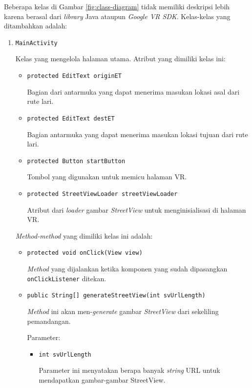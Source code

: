Beberapa kelas di Gambar \ref{fig:class-diagram} tidak memiliki deskripsi lebih karena berasal dari \textit{library} Java ataupun \textit{Google VR SDK}. Kelas-kelas yang ditambahkan adalah:

\begin{enumerate}
	\item \texttt{MainActivity}
	
	Kelas yang mengelola halaman utama. Atribut yang dimiliki kelas ini:
	
	\begin{itemize}
		\item \texttt{protected EditText originET}
		
		Bagian dari antarmuka yang dapat menerima masukan lokasi asal dari rute lari.
		\item \texttt{protected EditText destET}
		
		Bagian antarmuka yang dapat menerima masukan lokasi tujuan dari rute lari.
		\item \texttt{protected Button startButton}
		
		Tombol yang digunakan untuk memicu halaman VR.
		\item \texttt{protected StreetViewLoader streetViewLoader}
		
		Atribut dari \textit{loader} gambar \textit{StreetView} untuk menginisialisasi di halaman VR.
	\end{itemize}
	
	\textit{Method-method} yang dimiliki kelas ini adalah:
	
	\begin{itemize}
		\item \texttt{protected void onClick(View view)}
		
		\textit{Method} yang dijalankan ketika komponen yang sudah dipasangkan \texttt{onClickListener} ditekan. 
		\item \texttt{public String[] generateStreetView(int svUrlLength)}
		
		\textit{Method} ini akan men-\textit{generate} gambar \textit{StreetView} dari sekeliling pemandangan. 
		
		Parameter:
		
		\begin{itemize}
			\item \texttt{int svUrlLength}
			
			Parameter ini menyatakan berapa banyak \textit{string} URL untuk mendapatkan gambar-gambar StreetView.
		\end{itemize}
		

\end{itemize}
\end{enumerate}
